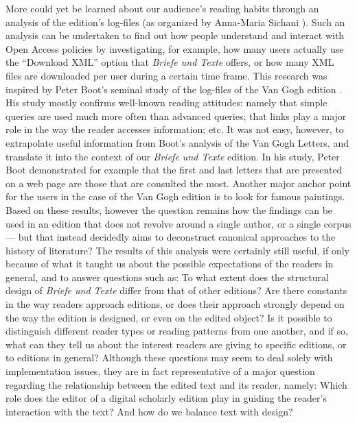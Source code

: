 \begin{paper}
More could yet be learned about our audience's reading habits
through an analysis of the edition's log-files (as organized
by Anna-Maria Sichani \citeyear{sichani_beyond_2016}). Such an analysis can be undertaken to find
out how people understand and interact with Open Access policies by investigating, for example, how
many users actually use the ``Download XML'' option that \emph{Briefe und
Texte} offers, or how many XML files are downloaded per user
during a certain time frame. This research was inspired by Peter Boot's
seminal study of the log-files of the Van Gogh edition \citep{boot_reading_2011}. His
study mostly confirms well-known reading attitudes: namely that simple queries are used
much more often than advanced queries; that links play a major role in the
way the reader accesses information; etc. It was not easy, however, to extrapolate useful information
from Boot's analysis of the Van Gogh Letters, and translate it into the context of our \emph{Briefe und Texte} edition. 
In his study, Peter Boot demonstrated for example that the first and last letters that are presented on
a web page are those that are consulted the most. Another major anchor point for the users in the case of the Van Gogh edition is to look for
famous paintings. Based on these results, however the question remains how the findings can be used in an edition that does not revolve
around a single author, or a single  corpus --- but that instead decidedly aims to deconstruct
canonical approaches to the history of literature? The results of this
analysis were certainly still useful, if only because of what it
taught us about the possible expectations of the readers in general, and to answer questions such as: To what
extent does the structural design of \emph{Briefe und Texte} differ from that of
other editions? Are there constants in the way readers approach editions, or does their approach
strongly depend on the way the edition is designed, or even on
the edited object? Is it possible to distinguish different reader types or reading
patterns from one another, and if so, what can they tell us about the interest readers are giving
to specific editions, or to editions in general? Although these questions may seem to deal solely with implementation issues, they are in fact representative of
a major question regarding the relationship between the edited text and its
reader, namely: Which role does the editor of a digital scholarly edition play
in guiding the reader's interaction with the text? And how do we balance text with design?


\end{paper}
